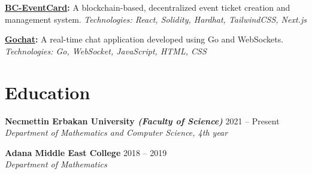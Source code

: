 \documentclass[10pt,a4paper]{extarticle}
\begin{document}
\vspace{5pt}
\noindent\textbf{\href{https://github.com/yusufokuducu/BC-EventCard}{BC-EventCard}:} A blockchain-based, decentralized event ticket creation and management system. \textit{Technologies: React, Solidity, Hardhat, TailwindCSS, Next.js}

\vspace{5pt}
\noindent\textbf{\href{https://github.com/yusufokuducu/gochat}{Gochat}:} A real-time chat application developed using Go and WebSockets. \textit{Technologies: Go, WebSocket, JavaScript, HTML, CSS}

\vspace{10pt}

\section{Education}
\textbf{Necmettin Erbakan University \textit{(Faculty of Science)}} \hfill 2021 -- Present\\
\textit{Department of Mathematics and Computer Science, 4th year}

\vspace{5pt}
\noindent\textbf{Adana Middle East College} \hfill 2018 -- 2019\\
\textit{Department of Mathematics}
\end{document}
